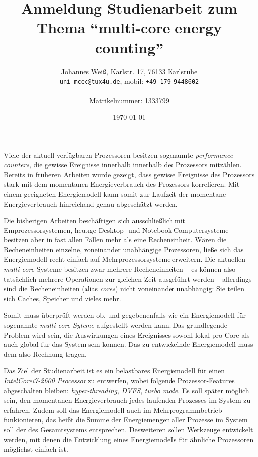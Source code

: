 \documentclass[a4paper,DIV=16]{scrartcl}
\newcommand{\JWemail}[1]{\texttt{#1}}
\newcommand{\JWphone}[1]{\texttt{#1}}
\newcommand{\JWemph}[1]{\emph{#1}}
\newcommand{\JWproduct}[1]{\JWemph{#1}}
\newcommand{\JWlone}[1]{\medskip}
\def\TReg{\textsuperscript{\textregistered}}
\def\TTra{\textsuperscript{\texttrademark}}
\begin{document}
\pagestyle{empty}

\title{Anmeldung Studienarbeit zum Thema "`multi-core energy counting"'}
\author{
  Johannes Weiß, Karlstr. 17, 76133 Karlsruhe\\
  \JWemail{uni-mcec@tux4u.de}, mobil: \JWphone{+49 179 9448602}\\
  \\
  Matrikelnummer: 1333799
}
\date{\today}
\maketitle
\thispagestyle{empty}
\pagestyle{empty}

\JWlone{Grundlagen}

Viele der aktuell verfügbaren Prozessoren besitzen sogenannte
\JWemph{performance counters}, die gewisse Ereignisse innerhalb innerhalb des
Prozessors mitzählen. Bereits in früheren Arbeiten wurde gezeigt, dass gewisse
Ereignisse des Prozessors stark mit dem momentanen Energieverbrauch des
Prozessors korrelieren. Mit einem geeigneten Energiemodell kann somit zur
Laufzeit der momentane Energieverbrauch hinreichend genau abgeschätzt werden.

\JWlone{Related Work}

Die bisherigen Arbeiten beschäftigen sich ausschließlich mit
Einprozessorsystemen, heutige Desktop- und Notebook-Computersysteme besitzen
aber in fast allen Fällen mehr als eine Recheneinheit. Wären die Recheneinheiten
einzelne, voneinander unabhängige Prozessoren, ließe sich das Energiemodell
recht einfach auf Mehrprozessorsysteme erweitern. Die aktuellen
\JWemph{multi-core} Systeme besitzen zwar mehrere Recheneinheiten -- es können
also tatsächlich mehrere Operationen zur gleichen Zeit ausgeführt werden --
allerdings sind die Recheneinheiten (alias \JWemph{cores}) nicht voneinander
unabhängig: Sie teilen sich Caches, Speicher und vieles mehr.


\JWlone{Problem}

Somit muss überprüft werden ob, und gegebenenfalls wie ein Energiemodell für
sogenannte \JWemph{multi-core Syteme} aufgestellt werden kann.  Das grundlegende
Problem wird sein, die Auswirkungen eines Ereignisses sowohl lokal pro Core als
auch global für das System sein können. Das zu entwickelnde Energiemodell muss
dem also Rechnung tragen.


\JWlone{Ziele}

Das Ziel der Studienarbeit ist es ein belastbares Energiemodell für einen
\JWproduct{Intel\TReg Core\TTra i7-2600 Processor} zu entwerfen, wobei folgende
Prozessor-Features abgeschalten bleiben: \JWemph{hyper-threading},
\JWemph{DVFS}, \JWemph{turbo mode}. Es soll später möglich sein, den momentanen
Energieverbrauch jedes laufenden Prozesses im System zu erfahren. Zudem soll das
Energiemodell auch im Mehrprogrammbetrieb funkionieren, das heißt die Summe der
Energiemengen aller Prozesse im System soll der des Gesamtsystems entsprechen.
Desweiteren sollen Werkzeuge entwickelt werden, mit denen die Entwicklung eines
Energiemodells für ähnliche Prozessoren möglichst einfach ist.
\end{document}
